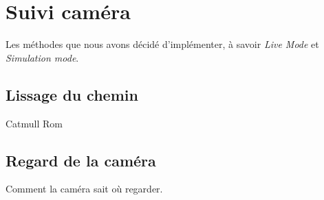 \section{Suivi caméra}
Les méthodes que nous avons décidé d'implémenter, à savoir \textit{Live Mode} et \textit{Simulation mode}.

\subsection{Lissage du chemin}
Catmull Rom

\subsection{Regard de la caméra}
Comment la caméra sait où regarder.